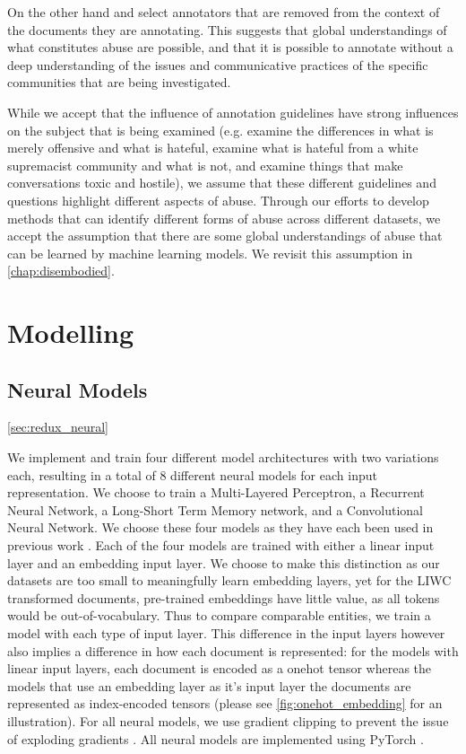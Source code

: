 On the other hand \citet{Garcia:2019} and \citet{Davidson:2017} select annotators that are removed from the context of the documents they are annotating. This suggests that global understandings of what constitutes abuse are possible, and that it is possible to annotate without a deep understanding of the issues and communicative practices of the specific communities that are being investigated.

While we accept that the influence of annotation guidelines have strong influences on the subject that is being examined (e.g. \citet{Davidson:2017} examine the differences in what is merely offensive and what is hateful, \citet{Garcia:2019} examine what is hateful from a white supremacist community and what is not, and \citet{Wulczyn:2017} examine things that make conversations toxic and hostile), we assume that these different guidelines and questions highlight different aspects of abuse. Through our efforts to develop methods that can identify different forms of abuse across different datasets, we accept the assumption that there are some global understandings of abuse that can be learned by machine learning models. We revisit this assumption in \autoref{chap:disembodied}.

\section{Modelling}

\subsection{Neural Models}\ref{sec:redux_neural}

We implement and train four different model architectures with two variations each, resulting in a total of 8 different neural models for each input representation. We choose to train a Multi-Layered Perceptron, a Recurrent Neural Network, a Long-Short Term Memory network, and a Convolutional Neural Network. We choose these four models as they have each been used in previous work \cite{CITE: Find papers with Neural approaches for each of the models}. Each of the four models are trained with either a linear input layer and an embedding input layer. We choose to make this distinction as our datasets are too small to meaningfully learn embedding layers, yet for the LIWC transformed documents, pre-trained embeddings have little value, as all tokens would be out-of-vocabulary. Thus to compare comparable entities, we train a model with each type of input layer. This difference in the input layers however also implies a difference in how each document is represented: for the models with linear input layers, each document is encoded as a onehot tensor whereas the models that use an embedding layer as it's input layer the documents are represented as index-encoded tensors (please see \autoref{fig:onehot_embedding} for an illustration). For all neural models, we use gradient clipping to prevent the issue of exploding gradients \cite{Bengio:1994}. All neural models are implemented using PyTorch \cite{CITE: Pytorch paper}.

